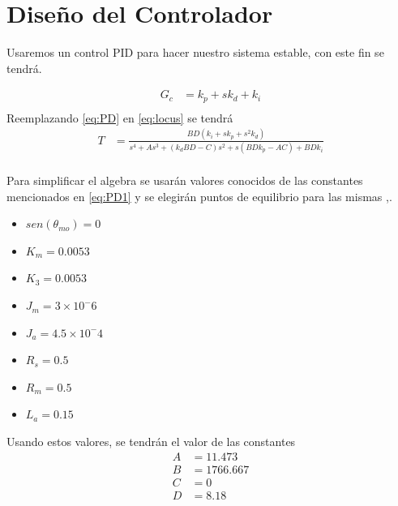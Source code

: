 \documentclass[a4paper]{IEEEtran} %
\begin{document}
\section{Diseño del Controlador}

Usaremos un control PID para hacer nuestro sistema estable, con este fin se tendrá.

\begin{equation}
    \begin{split}
        G_{c}&=k_{p}+sk_{d}+k_{i}\\
    \end{split}
    \label{eq:PD}
\end{equation}
Reemplazando \ref{eq:PD} en \ref{eq:locus} se tendrá
\begin{equation}
    \begin{split}
        T&=\frac{BD(k_{i}+sk_{p}+s^2k_{d})}{s^4+As^3+(k_{d}BD-C)s^2+s(BDk_{p}-AC)+BDk_{i}}\\
    \end{split}
    \label{eq:PD1}
\end{equation}

Para simplificar el algebra se usarán valores conocidos de las constantes mencionados en \ref{eq:PD1} y se elegirán puntos de equilibrio para las mismas \cite{dcmotor},\cite{edxpage}.
\begin{itemize}
    \item $sen(\theta_{mo})=0$
    \item $K_{m}=0.0053$
    \item $K_{3}=0.0053$
    \item $J_{m}=3\times 10^-6$
    \item $J_{a}=4.5\times 10^-4$
    \item $R_{s}=0.5$
    \item $R_{m}=0.5$
    \item $L_{a}=0.15$
\end{itemize}

Usando estos valores, se tendrán el valor de las constantes
\begin{equation}
    \begin{split}
        A&=11.473\\
        B&=1766.667\\
        C&=0\\
        D&=8.18\\
    \end{split}
    \label{eq:considera_numerica}
\end{equation}
\end{document}
